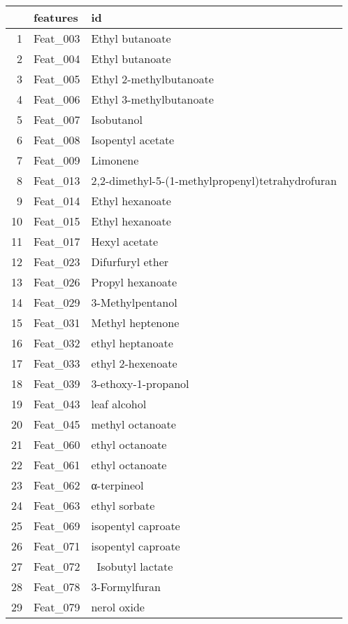 \begin{table}[ht]
\centering
\begin{tabular}{rll}
  \hline
 & features & id \\ 
  \hline
1 & Feat\_003 & Ethyl butanoate \\ 
  2 & Feat\_004 & Ethyl butanoate \\ 
  3 & Feat\_005 & Ethyl 2-methylbutanoate \\ 
  4 & Feat\_006 & Ethyl 3-methylbutanoate \\ 
  5 & Feat\_007 & Isobutanol \\ 
  6 & Feat\_008 & Isopentyl acetate \\ 
  7 & Feat\_009 & Limonene \\ 
  8 & Feat\_013 & 2,2-dimethyl-5-(1-methylpropenyl)tetrahydrofuran \\ 
  9 & Feat\_014 & Ethyl hexanoate \\ 
  10 & Feat\_015 & Ethyl hexanoate \\ 
  11 & Feat\_017 & Hexyl acetate \\ 
  12 & Feat\_023 & Difurfuryl ether \\ 
  13 & Feat\_026 & Propyl hexanoate \\ 
  14 & Feat\_029 & 3-Methylpentanol \\ 
  15 & Feat\_031 & Methyl heptenone \\ 
  16 & Feat\_032 & ethyl heptanoate \\ 
  17 & Feat\_033 & ethyl 2-hexenoate \\ 
  18 & Feat\_039 & 3-ethoxy-1-propanol \\ 
  19 & Feat\_043 & leaf alcohol \\ 
  20 & Feat\_045 & methyl octanoate \\ 
  21 & Feat\_060 & ethyl octanoate \\ 
  22 & Feat\_061 & ethyl octanoate \\ 
  23 & Feat\_062 & α-terpineol  \\ 
  24 & Feat\_063 & ethyl sorbate \\ 
  25 & Feat\_069 & isopentyl caproate \\ 
  26 & Feat\_071 & isopentyl caproate \\ 
  27 & Feat\_072 &  Isobutyl lactate \\ 
  28 & Feat\_078 & 3-Formylfuran \\ 
  29 & Feat\_079 & nerol oxide \\ 

\end{tabular}
\end{table}
